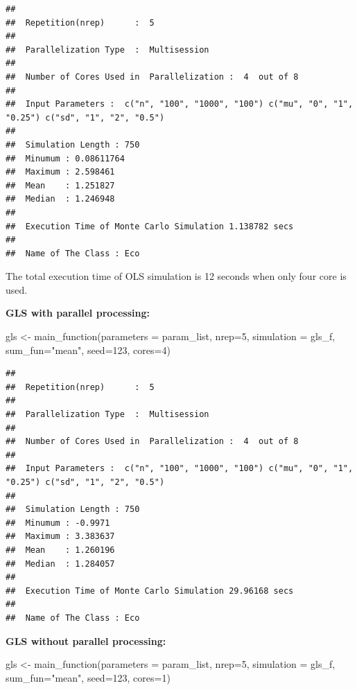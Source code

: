 \documentclass[11pt,a4paper]{article}
\newenvironment{Shaded}{\begin{snugshade}}{\end{snugshade}}
\newcommand{\AttributeTok}[1]{\textcolor[rgb]{0.77,0.63,0.00}{#1}}
\newcommand{\DecValTok}[1]{\textcolor[rgb]{0.00,0.00,0.81}{#1}}
\newcommand{\FunctionTok}[1]{\textcolor[rgb]{0.00,0.00,0.00}{#1}}
\newcommand{\NormalTok}[1]{#1}
\newcommand{\OtherTok}[1]{\textcolor[rgb]{0.56,0.35,0.01}{#1}}
\newcommand{\StringTok}[1]{\textcolor[rgb]{0.31,0.60,0.02}{#1}}
\begin{document}
\begin{verbatim}
## 
##  Repetition(nrep)      :  5 
## 
##  Parallelization Type  :  Multisession 
## 
##  Number of Cores Used in  Parallelization :  4  out of 8 
## 
##  Input Parameters :  c("n", "100", "1000", "100") c("mu", "0", "1", "0.25") c("sd", "1", "2", "0.5") 
## 
##  Simulation Length : 750 
##  Minumum : 0.08611764 
##  Maximum : 2.598461 
##  Mean    : 1.251827 
##  Median  : 1.246948 
## 
##  Execution Time of Monte Carlo Simulation 1.138782 secs 
## 
##  Name of The Class : Eco
\end{verbatim}

The total execution time of OLS simulation is 12 seconds when only four
core is used.

\textbf{GLS with parallel processing:}

\begin{Shaded}
\begin{Highlighting}[]
\NormalTok{gls }\OtherTok{\textless{}{-}} \FunctionTok{main\_function}\NormalTok{(}\AttributeTok{parameters =}\NormalTok{ param\_list,}
                     \AttributeTok{nrep=}\DecValTok{5}\NormalTok{,}
                     \AttributeTok{simulation =}\NormalTok{ gls\_f,}
                     \AttributeTok{sum\_fun=}\StringTok{"mean"}\NormalTok{,}
                     \AttributeTok{seed=}\DecValTok{123}\NormalTok{,}
                     \AttributeTok{cores=}\DecValTok{4}\NormalTok{)}
\end{Highlighting}
\end{Shaded}

\begin{verbatim}
## 
##  Repetition(nrep)      :  5 
## 
##  Parallelization Type  :  Multisession 
## 
##  Number of Cores Used in  Parallelization :  4  out of 8 
## 
##  Input Parameters :  c("n", "100", "1000", "100") c("mu", "0", "1", "0.25") c("sd", "1", "2", "0.5") 
## 
##  Simulation Length : 750 
##  Minumum : -0.9971 
##  Maximum : 3.383637 
##  Mean    : 1.260196 
##  Median  : 1.284057 
## 
##  Execution Time of Monte Carlo Simulation 29.96168 secs 
## 
##  Name of The Class : Eco
\end{verbatim}

\textbf{GLS without parallel processing:}

\begin{Shaded}
\begin{Highlighting}[]
\NormalTok{gls }\OtherTok{\textless{}{-}} \FunctionTok{main\_function}\NormalTok{(}\AttributeTok{parameters =}\NormalTok{ param\_list,}
                     \AttributeTok{nrep=}\DecValTok{5}\NormalTok{,}
                     \AttributeTok{simulation =}\NormalTok{ gls\_f,}
                     \AttributeTok{sum\_fun=}\StringTok{"mean"}\NormalTok{,}
                     \AttributeTok{seed=}\DecValTok{123}\NormalTok{,}
                     \AttributeTok{cores=}\DecValTok{1}\NormalTok{)}
\end{Highlighting}
\end{Shaded}
\end{document}
